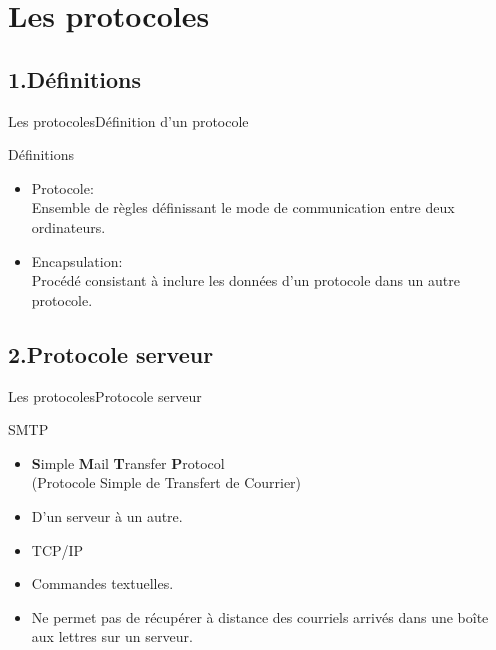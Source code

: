 \documentclass{beamer}
\begin{document}
\section{Les protocoles}
    \subsection{1.Définitions}
    
\begin{frame}{Les protocoles}{Définition d'un protocole}
  \begin{block}{Définitions}
  \begin{itemize}
    \item<1->{
    Protocole:\\
    Ensemble de règles définissant le mode de communication entre deux ordinateurs.
    }
  \item<2->{
    Encapsulation:\\
    Procédé consistant à inclure les données d'un protocole dans un autre protocole.
    }
  \end{itemize}
  \end{block}
\end{frame}



\subsection{2.Protocole serveur}
\begin{frame}{Les protocoles}{Protocole serveur}
  \begin{block}{SMTP}
  \begin{itemize}
    \item<1->{
    \textbf{S}imple \textbf{M}ail \textbf{T}ransfer \textbf{P}rotocol\\
    (Protocole Simple de Transfert de Courrier)
    }
  \item<2->{
    D'un serveur à un autre. 
    }
   \item<3->{
    TCP/IP
    }
    \item<4->{
    Commandes textuelles.
    }
    \item<5->{
    Ne permet pas de récupérer à distance des courriels arrivés dans une boîte aux lettres sur un serveur.
    }
  \end{itemize}
  \end{block}
\end{frame}
\end{document}
